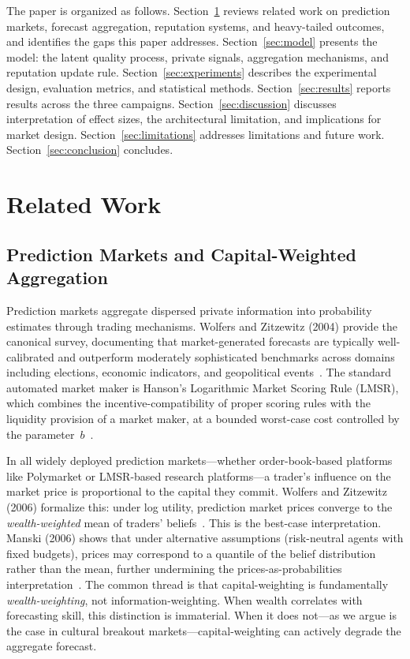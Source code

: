 \documentclass[conference]{IEEEtran}
\begin{document}
The paper is organized as follows. Section~\ref{sec:related} reviews related work on prediction markets, forecast aggregation, reputation systems, and heavy-tailed outcomes, and identifies the gaps this paper addresses. Section~\ref{sec:model} presents the model: the latent quality process, private signals, aggregation mechanisms, and reputation update rule. Section~\ref{sec:experiments} describes the experimental design, evaluation metrics, and statistical methods. Section~\ref{sec:results} reports results across the three campaigns. Section~\ref{sec:discussion} discusses interpretation of effect sizes, the architectural limitation, and implications for market design. Section~\ref{sec:limitations} addresses limitations and future work. Section~\ref{sec:conclusion} concludes.

\section{Related Work}
\label{sec:related}

\subsection{Prediction Markets and Capital-Weighted Aggregation}
\label{sec:related-markets}

Prediction markets aggregate dispersed private information into probability estimates through trading mechanisms. Wolfers and Zitzewitz (2004) provide the canonical survey, documenting that market-generated forecasts are typically well-calibrated and outperform moderately sophisticated benchmarks across domains including elections, economic indicators, and geopolitical events~\cite{wolfers2004}. The standard automated market maker is Hanson's Logarithmic Market Scoring Rule (LMSR), which combines the incentive-compatibility of proper scoring rules with the liquidity provision of a market maker, at a bounded worst-case cost controlled by the parameter~$b$~\cite{hanson2007}.

In all widely deployed prediction markets---whether order-book-based platforms like Polymarket or LMSR-based research platforms---a trader's influence on the market price is proportional to the capital they commit. Wolfers and Zitzewitz (2006) formalize this: under log utility, prediction market prices converge to the \emph{wealth-weighted} mean of traders' beliefs~\cite{wolfers2006}. This is the best-case interpretation. Manski (2006) shows that under alternative assumptions (risk-neutral agents with fixed budgets), prices may correspond to a quantile of the belief distribution rather than the mean, further undermining the prices-as-probabilities interpretation~\cite{manski2006}. The common thread is that capital-weighting is fundamentally \emph{wealth-weighting}, not information-weighting. When wealth correlates with forecasting skill, this distinction is immaterial. When it does not---as we argue is the case in cultural breakout markets---capital-weighting can actively degrade the aggregate forecast.
\end{document}
